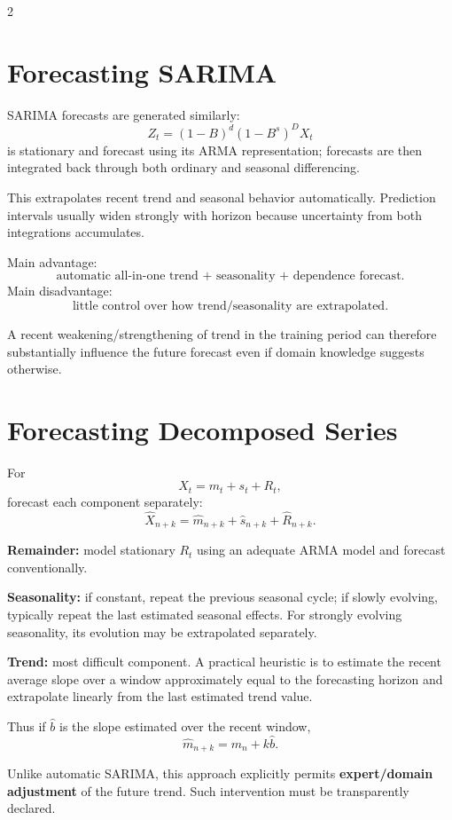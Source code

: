 \documentclass[9pt,a4paper]{extarticle}
\newcommand{\key}[1]{\textbf{#1}}
\begin{document}
\begin{multicols}{2}
\section{Forecasting SARIMA}

SARIMA forecasts are generated similarly:
\[
Z_t=(1-B)^d(1-B^s)^DX_t
\]
is stationary and forecast using its ARMA representation; forecasts are then integrated back through both ordinary and seasonal differencing.

This extrapolates recent trend and seasonal behavior automatically. Prediction intervals usually widen strongly with horizon because uncertainty from both integrations accumulates.

Main advantage:
\[
\boxed{\text{automatic all-in-one trend + seasonality + dependence forecast}.}
\]
Main disadvantage:
\[
\boxed{\text{little control over how trend/seasonality are extrapolated}.}
\]

A recent weakening/strengthening of trend in the training period can therefore substantially influence the future forecast even if domain knowledge suggests otherwise.

\section{Forecasting Decomposed Series}

For
\[
X_t=m_t+s_t+R_t,
\]
forecast each component separately:
\[
\boxed{
\widehat X_{n+k}
=
\widehat m_{n+k}
+\widehat s_{n+k}
+\widehat R_{n+k}.
}
\]

\key{Remainder:} model stationary \(R_t\) using an adequate ARMA model and forecast conventionally.

\key{Seasonality:} if constant, repeat the previous seasonal cycle; if slowly evolving, typically repeat the last estimated seasonal effects. For strongly evolving seasonality, its evolution may be extrapolated separately.

\key{Trend:} most difficult component. A practical heuristic is to estimate the recent average slope over a window approximately equal to the forecasting horizon and extrapolate linearly from the last estimated trend value.

Thus if \(\widehat b\) is the slope estimated over the recent window,
\[
\boxed{
\widehat m_{n+k}=m_n+k\widehat b.
}
\]

Unlike automatic SARIMA, this approach explicitly permits \key{expert/domain adjustment} of the future trend. Such intervention must be transparently declared.


\end{multicols}
\end{document}
